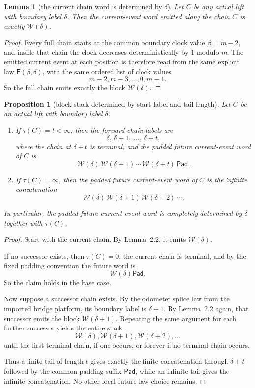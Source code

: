 \documentclass[11pt]{article}
\newtheorem{proposition}[theorem]{Proposition}
\newtheorem{lemma}[theorem]{Lemma}
\newcommand{\Word}{\mathcal W}
\newcommand{\Pad}{\mathsf{Pad}}
\newcommand{\tauv}{\tau}
\newcommand{\Ev}{\mathsf E}
\begin{document}
\begin{lemma}[the current chain word is determined by $\delta$]
Let $C$ be any actual lift with boundary label $\delta$. Then the current-event
word emitted along the chain $C$ is exactly $\Word(\delta)$.
\end{lemma}

\begin{proof}
Every full chain starts at the common boundary clock value $\beta=m-2$, and
inside that chain the clock decreases deterministically by $1$ modulo $m$.
The emitted current event at each position is therefore read from the same
explicit law $\Ev(\beta,\delta)$, with the same ordered list of clock values
\[
m-2,m-3,\dots,0,m-1.
\]
So the full chain emits exactly the block $\Word(\delta)$.
\end{proof}

\begin{proposition}[block stack determined by start label and tail length]
Let $C$ be an actual lift with boundary label $\delta$.
\begin{enumerate}[label=\textup{(\arabic*)},leftmargin=2.5em]
\item If $\tauv(C)=t<\infty$, then the forward chain labels are
      \[
      \delta,\ \delta+1,\ \dots,\ \delta+t,
      \]
      where the chain at $\delta+t$ is terminal, and the padded future
      current-event word of $C$ is
      \[
      \Word(\delta)\,\Word(\delta+1)\,\cdots\,\Word(\delta+t)\,\Pad.
      \]
\item If $\tauv(C)=\infty$, then the padded future current-event word of $C$
      is the infinite concatenation
      \[
      \Word(\delta)\,\Word(\delta+1)\,\Word(\delta+2)\,\cdots.
      \]
\end{enumerate}
In particular, the padded future current-event word is completely determined by
$\delta$ together with $\tauv(C)$.
\end{proposition}

\begin{proof}
Start with the current chain. By Lemma~2.2, it emits $\Word(\delta)$.

If no successor exists, then $\tauv(C)=0$, the current chain is terminal, and
by the fixed padding convention the future word is
\[
\Word(\delta)\Pad.
\]
So the claim holds in the base case.

Now suppose a successor chain exists. By the odometer splice law from the
imported bridge platform, its boundary label is $\delta+1$. By Lemma~2.2 again,
that successor emits the block $\Word(\delta+1)$. Repeating the same argument
for each further successor yields the entire stack
\[
\Word(\delta),\Word(\delta+1),\Word(\delta+2),\dots
\]
until the first terminal chain, if one occurs, or forever if no terminal chain
occurs.

Thus a finite tail of length $t$ gives exactly the finite concatenation through
$\delta+t$ followed by the common padding suffix $\Pad$, while an infinite tail
gives the infinite concatenation. No other local future-law choice remains.
\end{proof}
\end{document}
